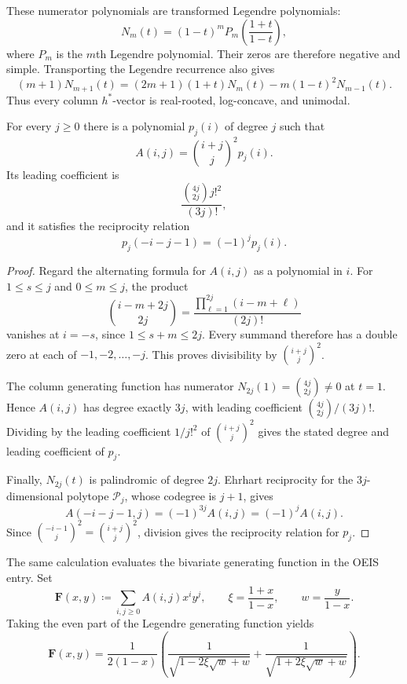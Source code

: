 These numerator polynomials are transformed Legendre polynomials:
\[
N_m(t)=(1-t)^mP_m\!\left(\frac{1+t}{1-t}\right),
\]
where $P_m$ is the $m$th Legendre polynomial.  Their zeros are therefore
negative and simple.  Transporting the Legendre recurrence also gives
\[
(m+1)N_{m+1}(t)
=(2m+1)(1+t)N_m(t)-m(1-t)^2N_{m-1}(t).
\]
Thus every column $h^*$-vector is real-rooted, log-concave, and unimodal.

\begin{corollary}
For every $j\geq0$ there is a polynomial $p_j(i)$ of degree $j$ such that
\[
A(i,j)=\binom{i+j}{j}^2p_j(i).
\]
Its leading coefficient is
\[
\frac{\binom{4j}{2j}j!^2}{(3j)!},
\]
and it satisfies the reciprocity relation
\[
p_j(-i-j-1)=(-1)^jp_j(i).
\]
\end{corollary}

\begin{proof}
Regard the alternating formula for $A(i,j)$ as a polynomial in $i$.  For
$1\leq s\leq j$ and $0\leq m\leq j$, the product
\[
\binom{i-m+2j}{2j}
=\frac{\prod_{\ell=1}^{2j}(i-m+\ell)}{(2j)!}
\]
vanishes at $i=-s$, since $1\leq s+m\leq2j$.  Every summand therefore has a
double zero at each of $-1,-2,\dotsc,-j$.  This proves divisibility by
$\binom{i+j}{j}^2$.

The column generating function has numerator
$N_{2j}(1)=\binom{4j}{2j}\neq0$ at $t=1$.  Hence $A(i,j)$ has degree exactly
$3j$, with leading coefficient $\binom{4j}{2j}/(3j)!$.  Dividing by the
leading coefficient $1/j!^2$ of $\binom{i+j}{j}^2$ gives the stated degree
and leading coefficient of $p_j$.

Finally, $N_{2j}(t)$ is palindromic of degree $2j$.  Ehrhart reciprocity for
the $3j$-dimensional polytope $\mathcal P_j$, whose codegree is $j+1$, gives
\[
A(-i-j-1,j)=(-1)^{3j}A(i,j)=(-1)^jA(i,j).
\]
Since
$\binom{-i-1}{j}^2=\binom{i+j}{j}^2$, division gives the reciprocity relation
for $p_j$.
\end{proof}

The same calculation evaluates the bivariate generating function in the OEIS
entry.  Set
\[
\mathbf F(x,y)\coloneqq\sum_{i,j\geq0}A(i,j)x^iy^j,
\qquad
\xi=\frac{1+x}{1-x},\qquad w=\frac{y}{1-x}.
\]
Taking the even part of the Legendre generating function yields
\[
\mathbf F(x,y)=\frac{1}{2(1-x)}\left(
\frac{1}{\sqrt{1-2\xi\sqrt w+w}}
+\frac{1}{\sqrt{1+2\xi\sqrt w+w}}
\right).
\]
